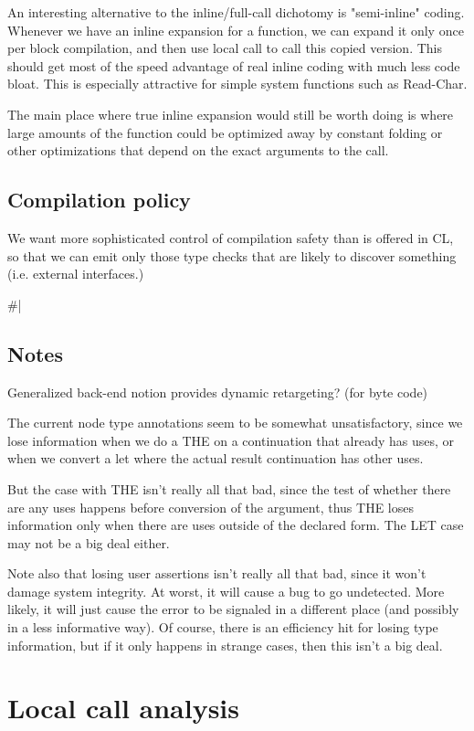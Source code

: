 An interesting alternative to the inline/full-call dichotomy is "semi-inline"
coding.  Whenever we have an inline expansion for a function, we can expand it
only once per block compilation, and then use local call to call this copied
version.  This should get most of the speed advantage of real inline coding
with much less code bloat.  This is especially attractive for simple system
functions such as Read-Char.

The main place where true inline expansion would still be worth doing is where
large amounts of the function could be optimized away by constant folding or
other optimizations that depend on the exact arguments to the call.



\section{Compilation policy}

We want more sophisticated control of compilation safety than is offered in CL,
so that we can emit only those type checks that are likely to discover
something (i.e. external interfaces.)

\#|


\section{Notes}

Generalized back-end notion provides dynamic retargeting?  (for byte code)

The current node type annotations seem to be somewhat unsatisfactory, since we
lose information when we do a THE on a continuation that already has uses, or
when we convert a let where the actual result continuation has other uses.  

But the case with THE isn't really all that bad, since the test of whether
there are any uses happens before conversion of the argument, thus THE loses
information only when there are uses outside of the declared form.  The LET
case may not be a big deal either.

Note also that losing user assertions isn't really all that bad, since it won't
damage system integrity.  At worst, it will cause a bug to go undetected.  More
likely, it will just cause the error to be signaled in a different place (and
possibly in a less informative way).  Of course, there is an efficiency hit for
losing type information, but if it only happens in strange cases, then this
isn't a big deal.


\chapter{Local call analysis}

